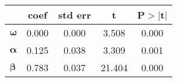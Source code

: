 \begin{center}
\begin{tabular}{lcccc}
    & \textbf{coef} & \textbf{std err} & \textbf{t} & \textbf{P$>|$t$|$} \\
\midrule
$\mathbf{\omega}$ & 0.000 & 0.000 & 3.508 & 0.000 \\
$\mathbf{\alpha}$ & 0.125 & 0.038 & 3.309 & 0.001 \\
$\mathbf{\beta}$ & 0.783 & 0.037 & 21.404 & 0.000 \\
\bottomrule
\end{tabular}
\end{center}